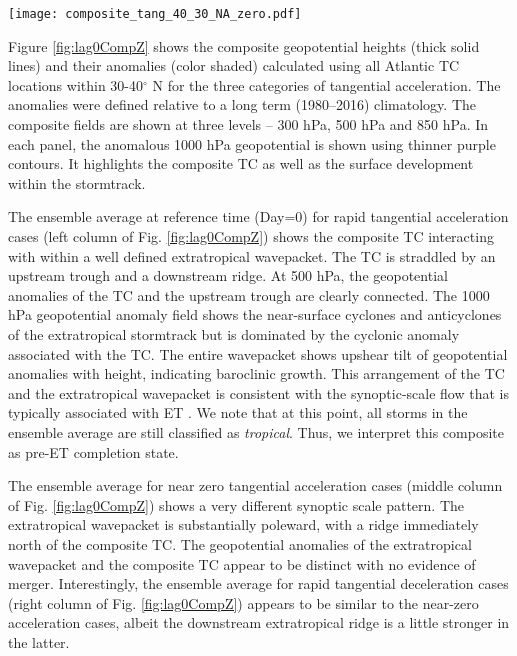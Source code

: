 \documentclass[wcd,manuscript]{copernicus}
\begin{document}
\begin{figure*}[t]
  \centering
    \texttt{[image: composite\_tang\_40\_30\_NA\_zero.pdf]}
  \caption{Storm-relative composite average geopotential heights (thick solid lines) and anomalies (color shaded) for all TCs located in the latitude bin 30-40$^o$N over the Atlantic. The composite fields are shown at three levels -- 300 hPa, 500 hPa and 850 hPa. In each panel, the anomalous 1000 hPa geopotential is shown using thinner purple contours. Left, center and right columns show the fields for rapid acceleration, near-zero and rapid deceleration respectively.}
  \label{fig:lag0CompZ}
\end{figure*}


Figure \ref{fig:lag0CompZ} shows the composite geopotential heights (thick solid lines) and their anomalies (color shaded) calculated using all Atlantic TC locations within 30-40$^\circ$ N for the three categories of tangential acceleration. The anomalies were defined relative to a long term (1980--2016) climatology. The composite fields are shown at three levels -- 300 hPa, 500 hPa and 850 hPa. In each panel, the anomalous 1000 hPa geopotential is shown using thinner purple contours. It highlights the composite TC as well as the surface development within the stormtrack. 

The ensemble average at reference time (Day=0) for rapid tangential acceleration cases (left column of Fig. \ref{fig:lag0CompZ}) shows the composite TC interacting with within a well defined extratropical wavepacket. The TC is straddled by an upstream trough and a downstream ridge. At 500 hPa, the geopotential anomalies of the TC and the upstream trough are clearly connected. The 1000 hPa geopotential anomaly field shows the near-surface cyclones and anticyclones of the extratropical stormtrack but is dominated by the cyclonic anomaly associated with the TC. The entire wavepacket shows upshear tilt of geopotential anomalies with height, indicating baroclinic growth. This arrangement of the TC and the extratropical wavepacket is consistent with the synoptic-scale flow that is typically associated with ET \citep[e.g.,][]{KHE2000,MGY2003,RJD2008,RJ2014,K2019}. We note that at this point, all storms in the ensemble average are still classified as \emph{tropical}. Thus, we interpret this composite as pre-ET completion state. 

The ensemble average for near zero tangential acceleration cases (middle column of Fig. \ref{fig:lag0CompZ}) shows a very different synoptic scale pattern. The extratropical wavepacket is substantially poleward, with a ridge immediately north of the composite TC. The geopotential anomalies of the extratropical wavepacket and the composite TC appear to be distinct with no evidence of merger. Interestingly, the ensemble average for rapid tangential deceleration cases (right column of Fig. \ref{fig:lag0CompZ}) appears to be similar to the near-zero acceleration cases, albeit the downstream extratropical ridge is a little stronger in the latter. 
\end{document}
